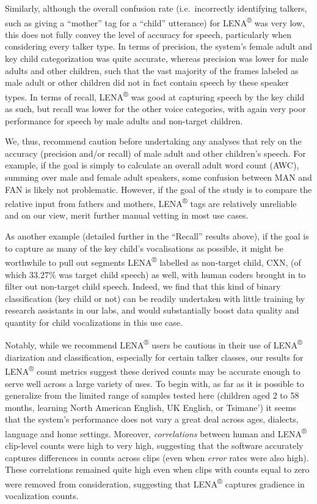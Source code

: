 \documentclass[english,floatsintext,man]{apa6}
\begin{document}
Similarly, although the overall confusion rate (i.e.~incorrectly
identifying talkers, such as giving a \enquote{mother} tag for a
\enquote{child} utterance) for LENA\textsuperscript{®} was very low,
this does not fully convey the level of accuracy for speech,
particularly when considering every talker type. In terms of precision,
the system's female adult and key child categorization was quite
accurate, whereas precision was lower for male adults and other
children, such that the vast majority of the frames labeled as male
adult or other children did not in fact contain speech by these speaker
types. In terms of recall, LENA\textsuperscript{®} was good at capturing
speech by the key child as such, but recall was lower for the other
voice categories, with again very poor performance for speech by male
adults and non-target children.

We, thus, recommend caution before undertaking any analyses that rely on
the accuracy (precision and/or recall) of male adult and other
children's speech. For example, if the goal is simply to calculate an
overall adult word count (AWC), summing over male and female adult
speakers, some confusion between MAN and FAN is likely not problematic.
However, if the goal of the study is to compare the relative input from
fathers and mothers, LENA\textsuperscript{®} tags are relatively
unreliable and on our view, merit further manual vetting in most use
cases.

As another example (detailed further in the \enquote{Recall} results
above), if the goal is to capture as many of the key child's
vocalisations as possible, it might be worthwhile to pull out segments
LENA\textsuperscript{®} labelled as non-target child, CXN, (of which
33.27\% was target child speech) as well, with human coders brought in
to filter out non-target child speech. Indeed, we find that this kind of
binary classification (key child or not) can be readily undertaken with
little training by research assistants in our labs, and would
substantially boost data quality and quantity for child vocalizations in
this use case.

Notably, while we recommend LENA\textsuperscript{®} users be cautious in
their use of LENA\textsuperscript{®} diarization and classification,
especially for certain talker classes, our results for
LENA\textsuperscript{®} count metrics suggest these derived counts may
be accurate enough to serve well across a large variety of uses. To
begin with, as far as it is possible to generalize from the limited
range of samples tested here (children aged 2 to 58 months, learning
North American English, UK English, or Tsimane') it seems that the
system's performance does not vary a great deal across ages, dialects,
language and home settings. Moreover, \emph{correlations} between human
and LENA\textsuperscript{®} clip-level counts were high to very high,
suggesting that the software accurately captures differences in counts
across clips (even when \emph{error} rates were also high). These
correlations remained quite high even when clips with counts equal to
zero were removed from consideration, suggesting that
LENA\textsuperscript{®} captures gradience in vocalization counts.
\end{document}
